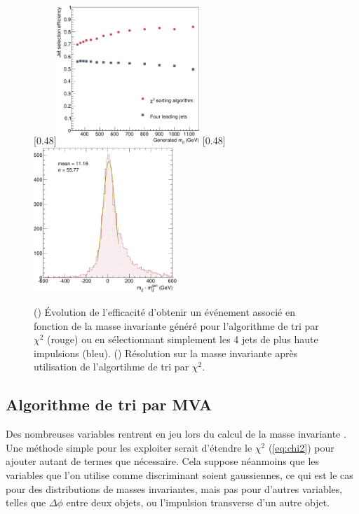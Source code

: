 \begin{figure}[tbp] \centering
    \subcaptionbox{\label{fig:chi2_vs_jets}}[0.48\textwidth]{\includegraphics[width=0.48\textwidth]{chapitre6/figs/chi2/jet_selection_efficiency.pdf}}
    \subcaptionbox{\label{fig:mtt_res_chi2}}[0.48\textwidth]{\includegraphics[width=0.48\textwidth]{chapitre6/figs/mtt_resolution_chi2.pdf}}
    \caption{() Évolution de l'efficacité d'obtenir un événement associé en fonction de la masse invariante \ttbar généré pour l'algorithme de tri par $\chi^2$ (\textcolor{rouge_grandmere}{rouge}) ou en sélectionnant simplement les 4 jets de plus haute impulsions (\textcolor{bleu_gris}{bleu}). () Résolution sur la masse invariante \ttbar après utilisation de l'algortihme de tri par $\chi^2$.}
    \label{fig:label}
\end{figure}

\subsection{Algorithme de tri par MVA}

Des nombreuses variables rentrent en jeu lors du calcul de la masse invariante \ttbar. Une méthode simple pour les exploiter serait d'étendre le $\chi^2$ (\cref{eq:chi2}) pour ajouter autant de termes que nécessaire. Cela suppose néanmoins que les variables que l'on utilise comme discriminant soient gaussiennes, ce qui est le cas pour des distributions de masses invariantes, mais pas pour d'autres variables, telles que $\Delta \phi$ entre deux objets, ou l'impulsion transverse d'un autre objet.

